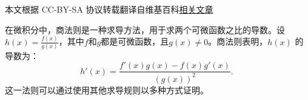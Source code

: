 
本文根据 CC-BY-SA 协议转载翻译自维基百科\href{https://en.wikipedia.org/wiki/Quotient_rule}{相关文章}

在微积分中，商法则是一种求导方法，用于求两个可微函数之比的导数。设$h(x) = \frac{f(x)}{g(x)}$，其中$f$和$g$都是可微函数，且$g(x) \neq 0$。商法则表明，$h(x)$ 的导数为：
$$
h'(x) = \frac{f'(x)g(x) - f(x)g'(x)}{(g(x))^2}.~
$$
这一法则可以通过使用其他求导规则以多种方式证明。
